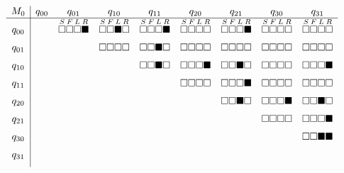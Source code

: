 \[
  \begin{array}{c|cccccccc}
    M_0 & q_{00} & q_{01} & q_{10} & q_{11} & q_{20} & q_{21} & q_{30} & q_{31} \\ \hline
    q_{00}       &        &
    \overset{S}{\square}\overset{F}{\square}\overset{L}{\square}\overset{R}{\blacksquare} &
    \overset{S}{\square}\overset{F}{\square}\overset{L}{\blacksquare}\overset{R}{\square} &
    \overset{S}{\square}\overset{F}{\square}\overset{L}{\square}\overset{R}{\blacksquare} &
    \overset{S}{\square}\overset{F}{\square}\overset{L}{\square}\overset{R}{\square} &
    \overset{S}{\square}\overset{F}{\square}\overset{L}{\square}\overset{R}{\blacksquare} &
    \overset{S}{\square}\overset{F}{\square}\overset{L}{\square}\overset{R}{\square} &
    \overset{S}{\square}\overset{F}{\square}\overset{L}{\square}\overset{R}{\square} \\ [6pt]
    q_{01}       &        &              & \square\square\square\square & \square\square\blacksquare\square & \square\square\square\square & \square\square\square\square & \square\square\square\square & \square\square\square\square \\ [6pt]
    q_{10}       &        &              &              & \square\square\blacksquare\square & \square\square\square\blacksquare & \square\square\blacksquare\square & \square\square\square\square & \square\square\square\blacksquare \\ [6pt]
    q_{11}       &        &              &              &              & \square\square\square\square & \square\square\square\blacksquare & \square\square\square\square & \square\square\square\square \\ [6pt]
    q_{20}       &        &              &              &              &              & \square\square\blacksquare\square & \square\square\square\blacksquare & \square\square\blacksquare\square \\ [6pt]
    q_{21}       &        &              &              &              &              &              & \square\square\square\square & \square\square\square\blacksquare \\ [6pt]
    q_{30}       &        &              &              &              &              &              &              & \square\square\blacksquare\blacksquare \\ [6pt]
    q_{31}       &        &              &              &              &              &              &              &              \\ [6pt]
  \end{array}
\]